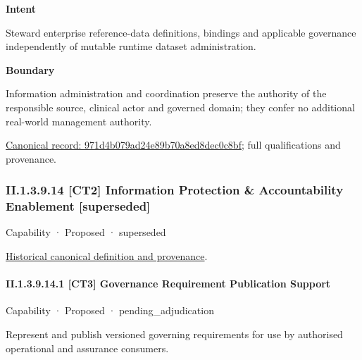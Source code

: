\textbf{Intent}



Steward enterprise reference-data definitions, bindings and applicable governance independently of mutable runtime dataset administration.



\textbf{Boundary}



Information administration and coordination preserve the authority of the responsible source, clinical actor and governed domain; they confer no additional real-world management authority.


{\footnotesize \href{../../../../../../../continuum/strategy/capability/971d4b079ad24e89b70a8ed8dec0c8bf.md}{Canonical record: 971d4b079ad24e89b70a8ed8dec0c8bf}; full qualifications and provenance.}\par
\subsubsection*{II.1.3.9.14 [CT2] Information Protection \& Accountability Enablement [superseded]}
\label{navigation:II.1.3.9.14}

\label{element:e922cba7cf1d4ebeb9abf6472a3803ce}
{\small Capability · Proposed · superseded}\par
\href{../../../../../../../continuum/strategy/capability/e922cba7cf1d4ebeb9abf6472a3803ce.md}{Historical canonical definition and provenance}.\par
\paragraph*{II.1.3.9.14.1 [CT3] Governance Requirement Publication Support}
\label{navigation:II.1.3.9.14.1}

\label{element:7e780751d50e4ffe942f8443b7cb6567}
{\small Capability · Proposed · pending\_adjudication}\par

Represent and publish versioned governing requirements for use by authorised operational and assurance consumers.



